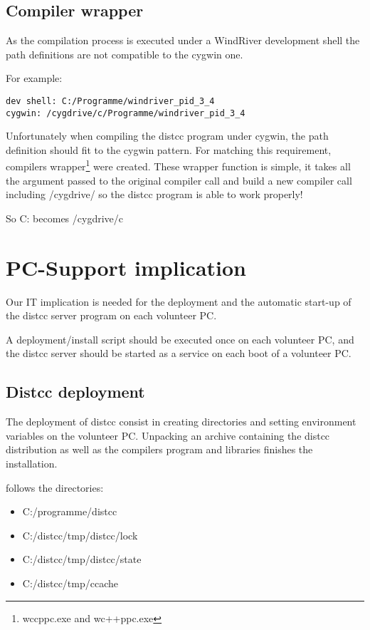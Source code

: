 \documentclass{article}
\begin{document}
\subsection{Compiler wrapper}
As the compilation process is executed under a WindRiver development shell the
path definitions are not compatible to the cygwin one.

For example:
\begin{verbatim}
dev shell: C:/Programme/windriver_pid_3_4
cygwin: /cygdrive/c/Programme/windriver_pid_3_4
\end{verbatim}

Unfortunately when compiling the distcc program under cygwin, the path
definition should fit to the cygwin pattern.
For matching this requirement, compilers wrapper\footnote{wccppc.exe and
wc++ppc.exe} were created.
These wrapper function is simple, it takes all the argument passed to the
original compiler call and build a new compiler call including /cygdrive/ so the
distcc program is able to work properly!

So C: becomes /cygdrive/c

\section{PC-Support implication}
Our IT implication is needed for the deployment and the automatic start-up of
the distcc server program on each volunteer PC.

A deployment/install script should be executed once on each volunteer PC, and
the distcc server should be started as a service on each boot of a volunteer PC.

\subsection{Distcc deployment}
The deployment of distcc consist in creating directories and setting environment
variables on the volunteer PC. Unpacking an archive containing the distcc
distribution as well as the compilers program and libraries finishes the
installation.

follows the directories:
\begin{itemize}
	\item C:/programme/distcc
	\item C:/distcc/tmp/distcc/lock
	\item C:/distcc/tmp/distcc/state
	\item C:/distcc/tmp/ccache
\end{itemize}
\end{document}
